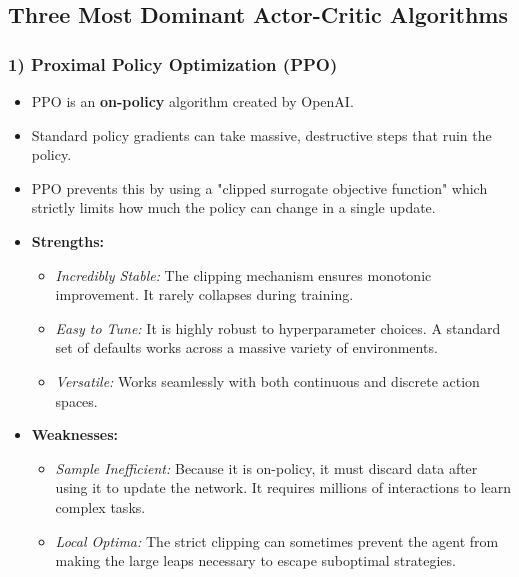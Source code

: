 \documentclass[12pt]{article}
\begin{document}
\subsection*{Three Most Dominant Actor-Critic Algorithms}

\subsubsection*{1) Proximal Policy Optimization (PPO)}
\begin{itemize}[label=$\bullet$]
    \item PPO is an \textbf{on-policy} algorithm created by OpenAI.
    \item Standard policy gradients can take massive, destructive steps that ruin the policy.
    \item PPO prevents this by using a "clipped surrogate objective function" which strictly limits how much the policy can change in a single update.
    \item \textbf{Strengths:}
    \begin{itemize}[label=$\circ$]
        \item \textit{Incredibly Stable:} The clipping mechanism ensures monotonic improvement. It rarely collapses during training.
        \item \textit{Easy to Tune:} It is highly robust to hyperparameter choices. A standard set of defaults works across a massive variety of environments.
        \item \textit{Versatile:} Works seamlessly with both continuous and discrete action spaces.
    \end{itemize}
    \item \textbf{Weaknesses:}
    \begin{itemize}[label=$\circ$]
        \item \textit{Sample Inefficient:} Because it is on-policy, it must discard data after using it to update the network. It requires millions of interactions to learn complex tasks.
        \item \textit{Local Optima:} The strict clipping can sometimes prevent the agent from making the large leaps necessary to escape suboptimal strategies.
    \end{itemize}
\end{itemize}
\end{document}
